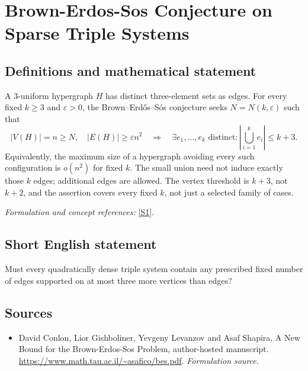 \documentclass[11pt]{article}
\begin{document}
\section*{\texorpdfstring{Brown-Erdos-Sos Conjecture on Sparse Triple Systems}{Brown-Erdos-Sos Conjecture on Sparse Triple Systems}}\label{417}
\subsection{Definitions and mathematical statement}
A $3$-uniform hypergraph $H$ has distinct three-element sets as edges. For every fixed $k\ge3$ and ${\varepsilon}>0$, the Brown--Erd\H{o}s--S\'os conjecture seeks $N=N(k,{\varepsilon})$ such that
\[
 |V(H)|=n\ge N,\quad |E(H)|\ge{\varepsilon} n^2
 \quad\Longrightarrow\quad
 \exists e_1,\ldots,e_k\text{ distinct}:\left|\bigcup_{i=1}^k e_i\right|\le k+3.
\]
Equivalently, the maximum size of a hypergraph avoiding every such configuration is $o(n^2)$ for fixed $k$. The small union need not induce exactly those $k$ edges; additional edges are allowed. The vertex threshold is $k+3$, not $k+2$, and the assertion covers every fixed $k$, not just a selected family of cases.
\par\smallskip\textit{Formulation and concept references:} \href{https://www.math.tau.ac.il/~asafico/bes.pdf}{[S1]}.

\subsection{Short English statement}
Must every quadratically dense triple system contain any prescribed fixed number of edges supported on at most three more vertices than edges?
\subsection{Sources}
\begin{itemize}
\item[S1]David Conlon, Lior Gishboliner, Yevgeny Levanzov and Asaf Shapira, A New Bound for the Brown-Erdos-Sos Problem, author-hosted manuscript.
\url{https://www.math.tau.ac.il/~asafico/bes.pdf}.
\textit{Formulation source.}
\end{itemize}
\end{document}
